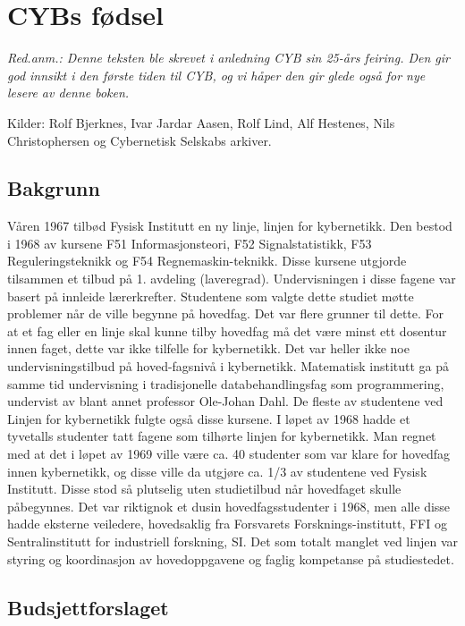 \chapter{CYBs fødsel}

\author{Skrevet av Jon E. Dahlen}

\textit{Red.anm.: Denne teksten ble skrevet i anledning CYB sin 25-års feiring. Den gir god innsikt i den første tiden til CYB, og vi håper den gir glede også for nye lesere av denne boken.}

Kilder: Rolf Bjerknes, Ivar Jardar Aasen, Rolf Lind, Alf Hestenes, Nils Christophersen og Cybernetisk Selskabs arkiver.

\section{Bakgrunn}

Våren 1967 tilbød Fysisk Institutt en ny linje, linjen for kybernetikk. Den bestod i 1968 av kursene F51 Informasjonsteori, F52 Signalstatistikk, F53 Reguleringsteknikk og F54 Regnemaskin-teknikk. Disse kursene utgjorde tilsammen et tilbud på 1. avdeling (laveregrad). Undervisningen i disse fagene var basert på innleide lærerkrefter. Studentene som valgte dette studiet møtte problemer når de ville begynne på hovedfag. Det var flere grunner til dette. For at et fag eller en linje skal kunne tilby hovedfag må det være minst ett dosentur innen faget, dette var ikke tilfelle for kybernetikk. Det var heller ikke noe undervisningstilbud på hoved-fagsnivå i kybernetikk. Matematisk institutt ga på samme tid undervisning i tradisjonelle databehandlingsfag som programmering, undervist av blant annet professor Ole-Johan Dahl. De fleste av studentene ved Linjen for kybernetikk fulgte også disse kursene. I løpet av 1968 hadde et tyvetalls studenter tatt fagene som tilhørte linjen for kybernetikk. Man regnet med at det i løpet av 1969 ville være ca. 40 studenter som var klare for hovedfag innen kybernetikk, og disse ville da utgjøre ca. 1/3 av studentene ved Fysisk Institutt. Disse stod så plutselig uten studietilbud når hovedfaget skulle påbegynnes. Det var riktignok et dusin hovedfagsstudenter i 1968, men alle disse hadde eksterne veiledere, hovedsaklig fra Forsvarets Forsknings-institutt, FFI og Sentralinstitutt for industriell forskning, SI. Det som totalt manglet ved linjen var styring og koordinasjon av hovedoppgavene og faglig kompetanse på studiestedet.

\section{Budsjettforslaget}

